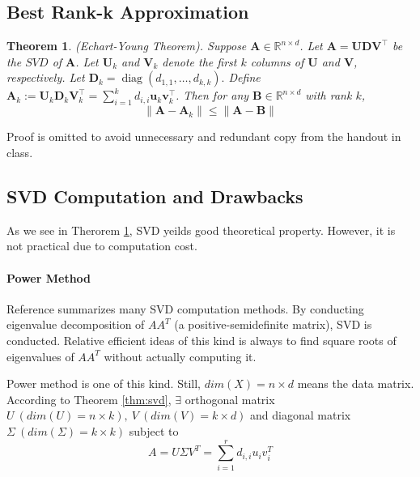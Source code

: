 \documentclass[12pt, a4paper, oneside]{article}
\newtheorem{theorem}{Theorem}
\begin{document}
\subsection{Best Rank-k Approximation}
\label{subsec:brka}

\begin{theorem}
	\label{thm:bestk}
	(Echart-Young Theorem). Suppose $\mathbf{A} \in \mathbb{R}^{n \times d}$. Let $\mathbf{A}=\mathbf{U D V}^{\top}$ be the $S V D$ of $\mathbf{A}$.
	Let $\mathbf{U}_{k}$ and $\mathbf{V}_{k}$ denote the first $k$ columns of $\mathbf{U}$ and $\mathbf{V}$, respectively. Let $\mathbf{D}_{k}=\operatorname{diag}\left(d_{1,1}, \ldots, d_{k, k}\right) .$
	Define $\mathbf{A}_{k}:=\mathbf{U}_{k} \mathbf{D}_{k} \mathbf{V}_{k}^{\top}=\sum_{i=1}^{k} d_{i, i} \mathbf{u}_{k} \mathbf{v}_{k}^{\top}$. Then for any $\mathbf{B} \in \mathbb{R}^{n \times d}$ with rank $k$,
	$$
	\left\|\mathbf{A}-\mathbf{A}_{k}\right\| \leq\|\mathbf{A}-\mathbf{B}\|
	$$
\end{theorem}

Proof is omitted to avoid unnecessary and redundant copy from the handout in class.

\subsection{SVD Computation and Drawbacks}
\label{subsec:dsvd}

As we see in Therorem \ref{thm:bestk}, SVD yeilds good theoretical property. However, it is not practical due to computation cost.

\paragraph{Power Method}

Reference \cite{algebra} summarizes many SVD computation methods. By conducting eigenvalue decomposition of $AA^T$ (a positive-semidefinite matrix), SVD is conducted. Relative efficient ideas of this kind is always to find square roots of eigenvalues of $AA^T$ without actually computing it.

Power method \cite{svd_rank} is one of this kind. Still, $dim(X) = n\times d$ means the data matrix. According to Theorem \ref{thm:svd}, $\exists$ orthogonal matrix $U\ (dim(U) = n\times k),\ V\ (dim(V) = k\times d)$ and diagonal matrix $\Sigma\ (dim(\Sigma) = k\times k)$ subject to
\begin{equation}
	A = U\Sigma V^T = \sum_{i = 1}^{r}{d_{i, i}u_iv_i^T}
\end{equation}
\end{document}

